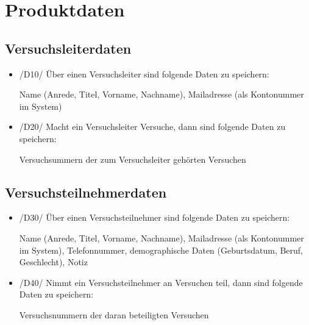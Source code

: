 \documentclass[a4paper]{scrreprt}
\begin{document}
    \chapter{Produktdaten}
        \section{Versuchsleiterdaten}
            \begin{itemize}
                \item /D10/ Über einen Versuchsleiter sind folgende Daten zu speichern:
                    \par Name (Anrede, Titel, Vorname, Nachname), Mailadresse (als Kontonummer im System)
                    
                \item /D20/ Macht ein Versuchsleiter Versuche, dann sind folgende Daten zu speichern:
                    \par Versuchsummern der zum Versuchsleiter gehörten Versuchen
            \end{itemize}
            
        \section{Versuchsteilnehmerdaten}
            \begin{itemize}
                \item /D30/ Über einen Versuchsteilnehmer sind folgende Daten zu speichern:
                    \par Name (Anrede, Titel, Vorname, Nachname), Mailadresse (als Kontonummer im System), Telefonnummer, demographische Daten (Geburtsdatum, Beruf, Geschlecht), Notiz
                
                \item /D40/ Nimmt ein Versuchsteilnehmer an Versuchen teil, dann sind folgende Daten zu speichern:
                    \par Versuchsnummern der daran beteiligten Versuchen
            \end{itemize}
            
\end{document}
